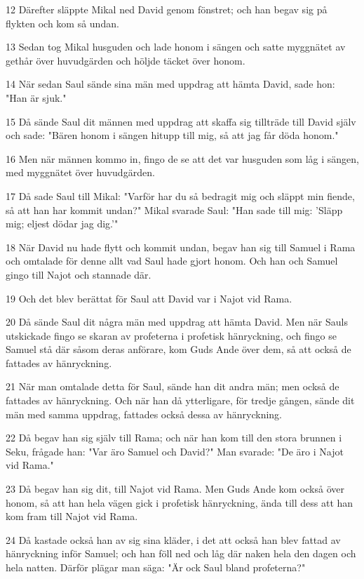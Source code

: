 \par 12 Därefter släppte Mikal ned David genom fönstret; och han begav sig på flykten och kom så undan.
\par 13 Sedan tog Mikal husguden och lade honom i sängen och satte myggnätet av gethår över huvudgärden och höljde täcket över honom.
\par 14 När sedan Saul sände sina män med uppdrag att hämta David, sade hon: "Han är sjuk."
\par 15 Då sände Saul dit männen med uppdrag att skaffa sig tillträde till David själv och sade: "Bären honom i sängen hitupp till mig, så att jag får döda honom."
\par 16 Men när männen kommo in, fingo de se att det var husguden som låg i sängen, med myggnätet över huvudgärden.
\par 17 Då sade Saul till Mikal: "Varför har du så bedragit mig och släppt min fiende, så att han har kommit undan?" Mikal svarade Saul: "Han sade till mig: 'Släpp mig; eljest dödar jag dig.'"
\par 18 När David nu hade flytt och kommit undan, begav han sig till Samuel i Rama och omtalade för denne allt vad Saul hade gjort honom. Och han och Samuel gingo till Najot och stannade där.
\par 19 Och det blev berättat för Saul att David var i Najot vid Rama.
\par 20 Då sände Saul dit några män med uppdrag att hämta David. Men när Sauls utskickade fingo se skaran av profeterna i profetisk hänryckning, och fingo se Samuel stå där såsom deras anförare, kom Guds Ande över dem, så att också de fattades av hänryckning.
\par 21 När man omtalade detta för Saul, sände han dit andra män; men också de fattades av hänryckning. Och när han då ytterligare, för tredje gången, sände dit män med samma uppdrag, fattades också dessa av hänryckning.
\par 22 Då begav han sig själv till Rama; och när han kom till den stora brunnen i Seku, frågade han: "Var äro Samuel och David?" Man svarade: "De äro i Najot vid Rama."
\par 23 Då begav han sig dit, till Najot vid Rama. Men Guds Ande kom också över honom, så att han hela vägen gick i profetisk hänryckning, ända till dess att han kom fram till Najot vid Rama.
\par 24 Då kastade också han av sig sina kläder, i det att också han blev fattad av hänryckning inför Samuel; och han föll ned och låg där naken hela den dagen och hela natten. Därför plägar man säga: "Är ock Saul bland profeterna?"

